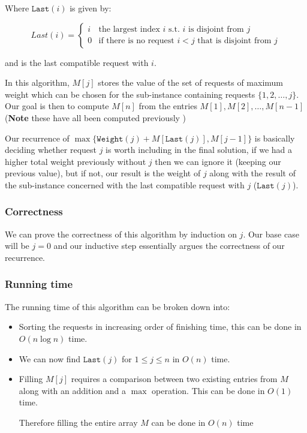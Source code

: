 \documentclass{article}
\begin{document}
Where $\texttt{Last} (i)$ is given by:

\[
  Last(i) = \begin{cases}
    i &\text{the largest index $i$ s.t. $i$ is disjoint from $j$}\\
    0 &\text{if there is no request $i<j$ that is disjoint from $j$}
  \end{cases}
\]

and is the last compatible request with $i$.

In this algorithm, $M[j]$ stores the value of the set of requests of maximum weight which can be chosen for the sub-instance containing requests $\{ 1,2,\ldots,j \} $. Our goal is then to compute $M[n]$ from the entries $M[1],M[2],\ldots, M[n-1]$ (\textbf{Note} these have all been computed previously )

Our recurrence of $\max \{ \texttt{Weight} (j) + M[\texttt{Last} (j)], M[j-1] \} $ is basically deciding whether request $j$ is worth including in the final solution, if we had a higher total weight previously without $j$ then we can ignore it (keeping our previous value), but if not, our result is the weight of $j$ along with the result of the sub-instance concerned with the last compatible request with $j$ ($\texttt{Last}(j) $).

\subsubsection{Correctness}

We can prove the correctness of this algorithm by induction on $j$. Our base case will be $j=0$ and our inductive step essentially argues the correctness of our recurrence.

\subsubsection{Running time}

The running time of this algorithm can be broken down into:

\begin{itemize}
  \item Sorting the requests in increasing order of finishing time, this can be done in $O(n\log n)$ time.
  \item We can now find $\texttt{Last}(j) $ for $1 \leq j\leq n$ in $O(n)$ time.
  \item Filling $M[j]$ requires a comparison between two existing entries from $M$ along with an addition and a $\max$ operation. This can be done in $O(1)$ time.

        Therefore filling the entire array $M$ can be done in $O(n)$ time

\end{itemize}
\end{document}

